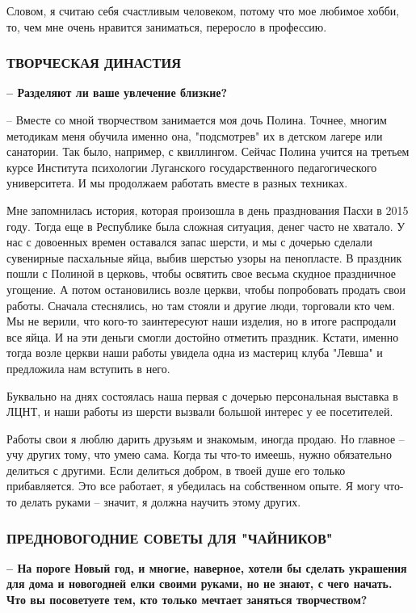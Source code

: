 Словом, я считаю себя счастливым человеком, потому что мое любимое хобби, то,
чем мне очень нравится заниматься, переросло в профессию.

\subsubsection{ТВОРЧЕСКАЯ ДИНАСТИЯ}

\textbf{– Разделяют ли ваше увлечение близкие?}

– Вместе со мной творчеством занимается моя дочь Полина. Точнее, многим
методикам меня обучила именно она, "подсмотрев" их в детском лагере или
санатории. Так было, например, с квиллингом. Сейчас Полина учится на третьем
курсе Института психологии Луганского государственного педагогического
университета. И мы продолжаем работать вместе в разных техниках.

Мне запомнилась история, которая произошла в день празднования Пасхи в 2015
году. Тогда еще в Республике была сложная ситуация, денег часто не хватало. У
нас с довоенных времен оставался запас шерсти, и мы с дочерью сделали
сувенирные пасхальные яйца, выбив шерстью узоры на пенопласте. В праздник пошли
с Полиной в церковь, чтобы освятить свое весьма скудное праздничное угощение. А
потом остановились возле церкви, чтобы попробовать продать свои работы. Сначала
стеснялись, но там стояли и другие люди, торговали кто чем. Мы не верили, что
кого-то заинтересуют наши изделия, но в итоге распродали все яйца. И на эти
деньги смогли достойно отметить праздник. Кстати, именно тогда возле церкви
наши работы увидела одна из мастериц клуба "Левша" и предложила нам вступить в
него.

Буквально на днях состоялась наша первая с дочерью персональная выставка в
ЛЦНТ, и наши работы из шерсти вызвали большой интерес у ее посетителей.

Работы свои я люблю дарить друзьям и знакомым, иногда продаю. Но главное – учу
других тому, что умею сама. Когда ты что-то имеешь, нужно обязательно делиться
с другими. Если делиться добром, в твоей душе его только прибавляется. Это все
работает, я убедилась на собственном опыте. Я могу что-то делать руками –
значит, я должна научить этому других.

\subsubsection{ПРЕДНОВОГОДНИЕ СОВЕТЫ ДЛЯ "ЧАЙНИКОВ"}

\textbf{– На пороге Новый год, и многие, наверное, хотели бы сделать украшения для дома
и новогодней елки своими руками, но не знают, с чего начать. Что вы посоветуете
тем, кто только мечтает заняться творчеством?}

